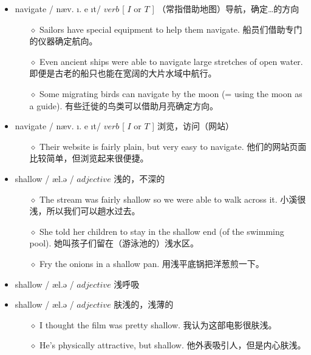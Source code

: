 \documentclass[a4paper,top=2.5cm,buttom=2.5cm10.5pt]{book}
\begin{document}
\begin{itemize}
\item navigate / \textprimstress næv. \i . \textscriptg e \i t/ $ verb $ [  $ I $  or  $ T $  ] （常指借助地图）导航，确定…的方向
\begin{itemize}
\item[$\diamond$] Sailors have special equipment to help them navigate.
船员们借助专门的仪器确定航向。
\item[$\diamond$] Even ancient ships were able to navigate large stretches of open water.
即便是古老的船只也能在宽阔的大片水域中航行。
\item[$\diamond$] Some migrating birds can navigate by the moon (= using the moon as a guide).
有些迁徙的鸟类可以借助月亮确定方向。
\end{itemize}
\end{itemize}
\begin{itemize}
\item navigate / \textprimstress næv. \i . \textscriptg e \i t/ $ verb $ [  $ I $  or  $ T $  ] 浏览，访问（网站）
\begin{itemize}
\item[$\diamond$] Their website is fairly plain, but very easy to navigate.
他们的网站页面比较简单，但浏览起来很便捷。
\end{itemize}
\end{itemize}
\begin{itemize}
\item shallow / \textprimstress  \textesh æl.ə \textupsilon / $ adjective $  浅的，不深的
\begin{itemize}
\item[$\diamond$] The stream was fairly shallow so we were able to walk across it.
小溪很浅，所以我们可以趟水过去。
\item[$\diamond$] She told her children to stay in the shallow end (of the swimming pool).
她叫孩子们留在（游泳池的）浅水区。
\item[$\diamond$] Fry the onions in a shallow pan.
用浅平底锅把洋葱煎一下。
\end{itemize}
\end{itemize}
\begin{itemize}
\item shallow / \textprimstress  \textesh æl.ə \textupsilon / $ adjective $  浅呼吸
\end{itemize}
\begin{itemize}
\item shallow / \textprimstress  \textesh æl.ə \textupsilon / $ adjective $  肤浅的，浅薄的
\begin{itemize}
\item[$\diamond$] I thought the film was pretty shallow.
我认为这部电影很肤浅。
\item[$\diamond$] He's physically attractive, but shallow.
他外表吸引人，但是内心肤浅。
\end{itemize}
\end{itemize}
\end{document}
